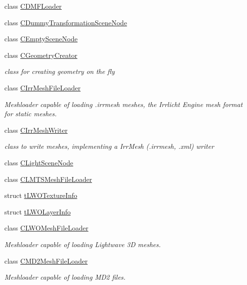 \begin{DoxyCompactItemize}
class \hyperlink{classirr_1_1scene_1_1_c_d_m_f_loader}{C\-D\-M\-F\-Loader}
\item 
class \hyperlink{classirr_1_1scene_1_1_c_dummy_transformation_scene_node}{C\-Dummy\-Transformation\-Scene\-Node}
\item 
class \hyperlink{classirr_1_1scene_1_1_c_empty_scene_node}{C\-Empty\-Scene\-Node}
\item 
class \hyperlink{classirr_1_1scene_1_1_c_geometry_creator}{C\-Geometry\-Creator}
\begin{DoxyCompactList}\small\item\em class for creating geometry on the fly \end{DoxyCompactList}\item 
class \hyperlink{classirr_1_1scene_1_1_c_irr_mesh_file_loader}{C\-Irr\-Mesh\-File\-Loader}
\begin{DoxyCompactList}\small\item\em Meshloader capable of loading .irrmesh meshes, the Irrlicht Engine mesh format for static meshes. \end{DoxyCompactList}\item 
class \hyperlink{classirr_1_1scene_1_1_c_irr_mesh_writer}{C\-Irr\-Mesh\-Writer}
\begin{DoxyCompactList}\small\item\em class to write meshes, implementing a Irr\-Mesh (.irrmesh, .xml) writer \end{DoxyCompactList}\item 
class \hyperlink{classirr_1_1scene_1_1_c_light_scene_node}{C\-Light\-Scene\-Node}
\item 
class \hyperlink{classirr_1_1scene_1_1_c_l_m_t_s_mesh_file_loader}{C\-L\-M\-T\-S\-Mesh\-File\-Loader}
\item 
struct \hyperlink{structirr_1_1scene_1_1t_l_w_o_texture_info}{t\-L\-W\-O\-Texture\-Info}
\item 
struct \hyperlink{structirr_1_1scene_1_1t_l_w_o_layer_info}{t\-L\-W\-O\-Layer\-Info}
\item 
class \hyperlink{classirr_1_1scene_1_1_c_l_w_o_mesh_file_loader}{C\-L\-W\-O\-Mesh\-File\-Loader}
\begin{DoxyCompactList}\small\item\em Meshloader capable of loading Lightwave 3\-D meshes. \end{DoxyCompactList}\item 
class \hyperlink{classirr_1_1scene_1_1_c_m_d2_mesh_file_loader}{C\-M\-D2\-Mesh\-File\-Loader}
\begin{DoxyCompactList}\small\item\em Meshloader capable of loading M\-D2 files. \end{DoxyCompactList}\item 

\end{DoxyCompactItemize}
